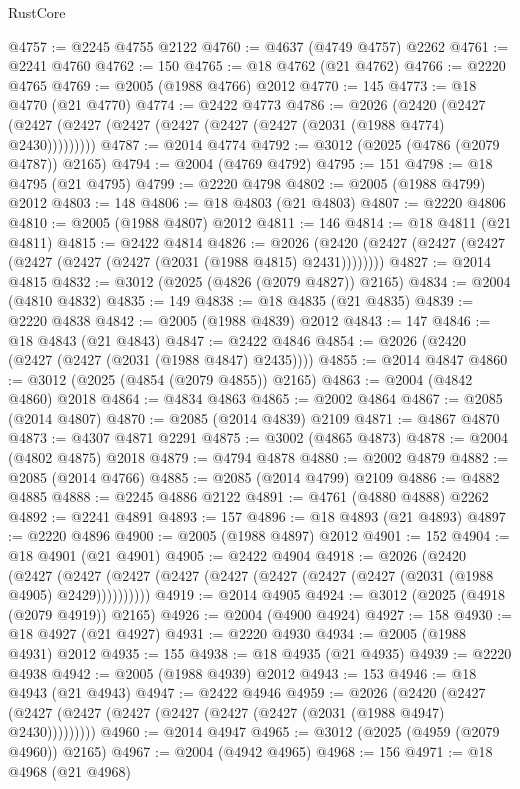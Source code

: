 \begin{lexlean}{RustCore}
\begin{coremodule}
@4757 := @2245 @4755 @2122
@4760 := @4637 (@4749 @4757) @2262
@4761 := @2241 @4760
@4762 := 150
@4765 := @18 @4762 (@21 @4762)
@4766 := @2220 @4765
@4769 := @2005 (@1988 @4766) @2012
@4770 := 145
@4773 := @18 @4770 (@21 @4770)
@4774 := @2422 @4773
@4786 := @2026
    (@2420 (@2427 (@2427 (@2427 (@2427 (@2427 (@2427 (@2427 (@2031 (@1988 @4774) @2430)))))))))
@4787 := @2014 @4774
@4792 := @3012 (@2025 (@4786 (@2079 @4787)) @2165)
@4794 := @2004 (@4769 @4792)
@4795 := 151
@4798 := @18 @4795 (@21 @4795)
@4799 := @2220 @4798
@4802 := @2005 (@1988 @4799) @2012
@4803 := 148
@4806 := @18 @4803 (@21 @4803)
@4807 := @2220 @4806
@4810 := @2005 (@1988 @4807) @2012
@4811 := 146
@4814 := @18 @4811 (@21 @4811)
@4815 := @2422 @4814
@4826 := @2026 (@2420 (@2427 (@2427 (@2427 (@2427 (@2427 (@2427 (@2031 (@1988 @4815) @2431))))))))
@4827 := @2014 @4815
@4832 := @3012 (@2025 (@4826 (@2079 @4827)) @2165)
@4834 := @2004 (@4810 @4832)
@4835 := 149
@4838 := @18 @4835 (@21 @4835)
@4839 := @2220 @4838
@4842 := @2005 (@1988 @4839) @2012
@4843 := 147
@4846 := @18 @4843 (@21 @4843)
@4847 := @2422 @4846
@4854 := @2026 (@2420 (@2427 (@2427 (@2031 (@1988 @4847) @2435))))
@4855 := @2014 @4847
@4860 := @3012 (@2025 (@4854 (@2079 @4855)) @2165)
@4863 := @2004 (@4842 @4860) @2018
@4864 := @4834 @4863
@4865 := @2002 @4864
@4867 := @2085 (@2014 @4807)
@4870 := @2085 (@2014 @4839) @2109
@4871 := @4867 @4870
@4873 := @4307 @4871 @2291
@4875 := @3002 (@4865 @4873)
@4878 := @2004 (@4802 @4875) @2018
@4879 := @4794 @4878
@4880 := @2002 @4879
@4882 := @2085 (@2014 @4766)
@4885 := @2085 (@2014 @4799) @2109
@4886 := @4882 @4885
@4888 := @2245 @4886 @2122
@4891 := @4761 (@4880 @4888) @2262
@4892 := @2241 @4891
@4893 := 157
@4896 := @18 @4893 (@21 @4893)
@4897 := @2220 @4896
@4900 := @2005 (@1988 @4897) @2012
@4901 := 152
@4904 := @18 @4901 (@21 @4901)
@4905 := @2422 @4904
@4918 := @2026
    (@2420
      (@2427 (@2427 (@2427 (@2427 (@2427 (@2427 (@2427 (@2427 (@2031 (@1988 @4905) @2429))))))))))
@4919 := @2014 @4905
@4924 := @3012 (@2025 (@4918 (@2079 @4919)) @2165)
@4926 := @2004 (@4900 @4924)
@4927 := 158
@4930 := @18 @4927 (@21 @4927)
@4931 := @2220 @4930
@4934 := @2005 (@1988 @4931) @2012
@4935 := 155
@4938 := @18 @4935 (@21 @4935)
@4939 := @2220 @4938
@4942 := @2005 (@1988 @4939) @2012
@4943 := 153
@4946 := @18 @4943 (@21 @4943)
@4947 := @2422 @4946
@4959 := @2026
    (@2420 (@2427 (@2427 (@2427 (@2427 (@2427 (@2427 (@2427 (@2031 (@1988 @4947) @2430)))))))))
@4960 := @2014 @4947
@4965 := @3012 (@2025 (@4959 (@2079 @4960)) @2165)
@4967 := @2004 (@4942 @4965)
@4968 := 156
@4971 := @18 @4968 (@21 @4968)

\end{coremodule}
\end{lexlean}
